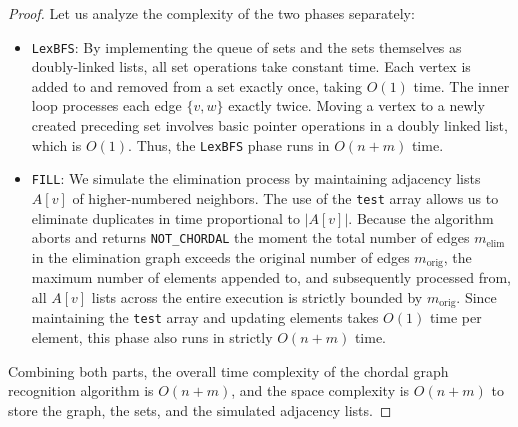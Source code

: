 \begin{proof}
Let us analyze the complexity of the two phases separately:
\begin{itemize}
    \item \texttt{LexBFS}: By implementing the queue of sets and the sets themselves as doubly-linked lists, all set operations take constant time. Each vertex is added to and removed from a set exactly once, taking $O(1)$ time. The inner loop processes each edge $\{v, w\}$ exactly twice. Moving a vertex to a newly created preceding set involves basic pointer operations in a doubly linked list, which is $O(1)$. Thus, the \texttt{LexBFS} phase runs in $O(n + m)$ time.
    
    \item \texttt{FILL}: We simulate the elimination process by maintaining adjacency lists $A[v]$ of higher-numbered neighbors. The use of the \texttt{test} array allows us to eliminate duplicates in time proportional to $|A[v]|$. Because the algorithm aborts and returns \texttt{NOT\_CHORDAL} the moment the total number of edges $m_{\text{elim}}$ in the elimination graph exceeds the original number of edges $m_{\text{orig}}$, the maximum number of elements appended to, and subsequently processed from, all $A[v]$ lists across the entire execution is strictly bounded by $m_{\text{orig}}$. Since maintaining the \texttt{test} array and updating elements takes $O(1)$ time per element, this phase also runs in strictly $O(n + m)$ time.
\end{itemize}
Combining both parts, the overall time complexity of the chordal graph recognition algorithm is $O(n + m)$, and the space complexity is $O(n + m)$ to store the graph, the sets, and the simulated adjacency lists.
\end{proof}